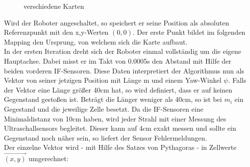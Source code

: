 \documentclass[twoside,12pt,a4paper]{report}
\begin{document}
	\begin{figure}[!htb]
		\centering
		\qquad
		\caption{verschiedene Karten}%
		\label{fig:Karten}%
	\end{figure}
	
	Wird der Roboter angeschaltet, so speichert er seine Position als absoluten Referenzpunkt mit den x,y-Werten $(0,0)$. Der erste Punkt bildet im folgenden Mapping den Ursprung, von welchem sich die Karte aufbaut. \\
	In der ersten Iteration dreht sich der Roboter einmal vollständig um die eigene Hauptachse. Dabei misst er im Takt von 0.0005s den Abstand mit Hilfe der beiden vorderen IF-Sensoren. Diese Daten interpretiert der Algorithmus nun als Vektor von seiner jetzigen Position mit Länge m und einem Yaw-Winkel $\psi$. Falls der Vektor eine Länge größer 40cm hat, so wird definiert, dass er auf keinen Gegenstand gestoßen ist. Beträgt die Länger weniger als 40cm, so ist bei $m_i$ ein Gegestand und die jeweilige Zelle besetzt. Da die IF-Sensoren eine Minimaldistanz von 10cm haben, wird jeder Strahl mit einer Messung des Ultraschallsensors begleitet. Dieser kann auf 4cm exakt messen und sollte ein Gegenstand noch näher sein, so liefert der Sensor Fehlermeldungen. \\
	Der einzelne Vektor wird - mit Hilfe des Satzes von Pythagoras - in Zellwerte $\vec{(x,y)}$ umgerechnet:
	
\end{document}

